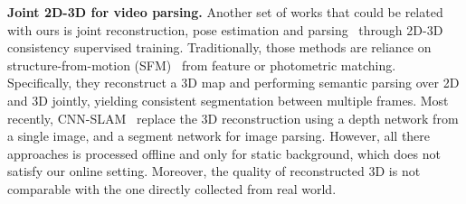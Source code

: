 \documentclass[10pt,twocolumn,letterpaper]{article}
\begin{document}
\textbf{Joint 2D-3D for video parsing.} Another set of works that could be related with ours is joint reconstruction, pose estimation and parsing~\cite{kundu2014joint,hane2013joint} through 2D-3D consistency supervised training. 
 Traditionally, those methods are reliance on structure-from-motion (SFM)~\cite{hane2013joint} from feature or photometric matching. Specifically, they reconstruct a 3D map and performing semantic parsing over 2D and 3D jointly, yielding consistent segmentation between multiple frames. 
 Most recently, CNN-SLAM~\cite{tateno2017cnn} replace the 3D reconstruction using a depth network from a single image, and a segment network for image parsing.
 However, all there approaches is processed offline and only for static background, which does not satisfy our online setting. Moreover, the quality of reconstructed 3D is not comparable with the one directly collected from real world.
\end{document}
